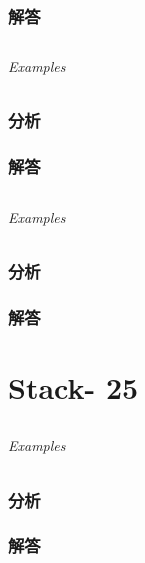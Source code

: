 \documentclass[UTF8,a4paper,12pt]{ctexbook}
\begin{document}
	\subsection{解答}
	
\section{}
	
	\subparagraph{Examples}
	
	\subsection{分析}
	
	\subsection{解答}
	
\section{}
	
	\subparagraph{Examples}
	
	\subsection{分析}
	
	\subsection{解答}
	
\chapter{Stack- 25}
\section{}
	
	\subparagraph{Examples}
	
	\subsection{分析}
	
	\subsection{解答}
	
\section{}
	
\end{document}
